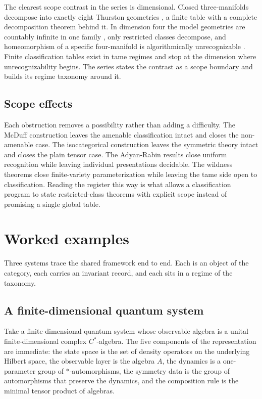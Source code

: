 \documentclass[11pt,letterpaper]{article}
\theoremstyle{definition}
\theoremstyle{remark}
\begin{document}
The clearest scope contrast in the series is dimensional. Closed three-manifolds decompose into exactly eight Thurston geometries \cite{corpus-60,corpus-70}, a finite table with a complete decomposition theorem behind it. In dimension four the model geometries are countably infinite in one family \cite{corpus-60}, only restricted classes decompose, and homeomorphism of a specific four-manifold is algorithmically unrecognizable \cite{corpus-54}. Finite classification tables exist in tame regimes and stop at the dimension where unrecognizability begins. The series states the contrast as a scope boundary and builds its regime taxonomy around it.

\subsection{Scope effects}

Each obstruction removes a possibility rather than adding a difficulty. The McDuff construction \cite{corpus-65} leaves the amenable classification intact and closes the non-amenable case. The isocategorical construction \cite{corpus-74} leaves the symmetric theory intact and closes the plain tensor case. The Adyan-Rabin results \cite{corpus-53} close uniform recognition while leaving individual presentations decidable. The wildness theorems \cite{corpus-55,corpus-56,corpus-58} close finite-variety parameterization while leaving the tame side open to classification. Reading the register this way is what allows a classification program to state restricted-class theorems with explicit scope instead of promising a single global table.

\section{Worked examples}

Three systems trace the shared framework end to end. Each is an object of the category, each carries an invariant record, and each sits in a regime of the taxonomy.

\subsection{A finite-dimensional quantum system}

Take a finite-dimensional quantum system whose observable algebra is a unital finite-dimensional complex $C^*$-algebra. The five components of the representation are immediate: the state space is the set of density operators on the underlying Hilbert space, the observable layer is the algebra $A$, the dynamics is a one-parameter group of $*$-automorphisms, the symmetry data is the group of automorphisms that preserve the dynamics, and the composition rule is the minimal tensor product of algebras.
\end{document}
